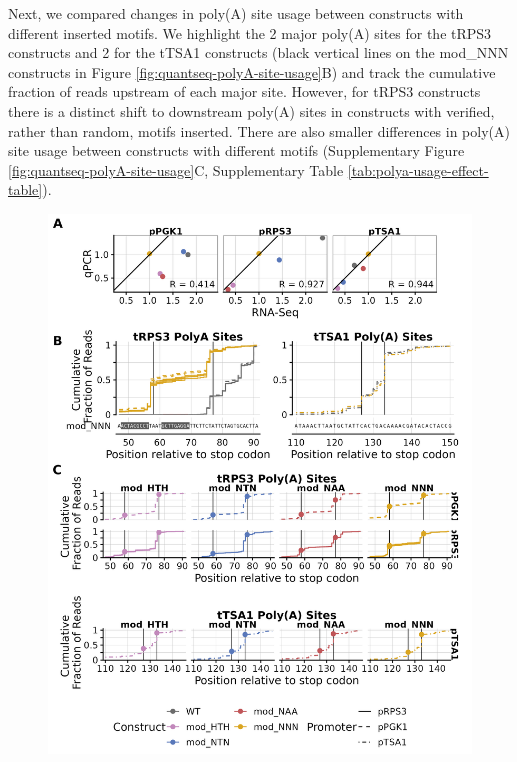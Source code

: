 \documentclass{SBCbookchapter}
\begin{document}
Next, we compared changes in poly(A) site usage between constructs with different inserted motifs.
We highlight the 2 major poly(A) sites for the tRPS3 constructs and 2 for the tTSA1 constructs (black vertical lines on the mod\_NNN constructs in Figure \ref{fig:quantseq-polyA-site-usage}B) and track the cumulative fraction of reads upstream of each major site.
However, for tRPS3 constructs there is a distinct shift to downstream poly(A) sites in constructs with verified, rather than random, motifs inserted.
There are also smaller differences in poly(A) site usage between constructs with different motifs (Supplementary Figure \ref{fig:quantseq-polyA-site-usage}C, Supplementary Table \ref{tab:polya-usage-effect-table}).

\begin{figure}[p]

{\centering \includegraphics[width=0.85\linewidth]{figures/polya_usage_plot_QuantSeq.png} 

}


\end{figure}
\end{document}
